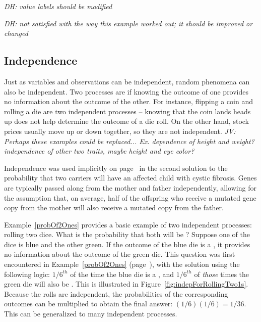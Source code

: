 \textit{DH: value labels should be modified}

\textit{DH: not satisfied with the way this example worked out; it should be improved or changed}

\subsection{Independence}
\label{probabilityIndependence}

Just as variables and observations can be independent, random phenomena can also be independent. Two processes are  if knowing the outcome of one provides no information about the outcome of the other. For instance, flipping a coin and rolling a die are two independent processes -- knowing that the coin lands heads up does not help determine the outcome of a die roll. On the other hand, stock prices usually move up or down together, so they are not independent. \textit{JV: Perhaps these examples could be replaced... Ex. dependence of height and weight? independence of other two traits, maybe height and eye color?}

Independence was used implicitly on page~\pageref{CFInheritanceExample} in the second solution to the probability that two carriers will have an affected child with cystic fibrosis. Genes are typically passed along from the mother and father independently, allowing for the assumption that, on average, half of the offspring who receive a mutated gene copy from the mother will also receive a mutated copy from the father.

Example~\ref{probOf2Ones} provides a basic example of two independent processes: rolling two dice. What is the probability that both will be ? Suppose one of the dice is blue and the other green. If the outcome of the blue die is a , it provides no information about the outcome of the green die. This question was first encountered in Example~\ref{probOf2Ones} (page~\pageref{probOf2Ones}), with the solution using the following logic: $1/6^{th}$ of the time the blue die is a , and $1/6^{th}$ of \emph{those} times the green die will also be . This is illustrated in Figure~\ref{fig:indepForRollingTwo1s}. Because the rolls are independent, the probabilities of the corresponding outcomes can be multiplied to obtain the final answer: $(1/6)(1/6)=1/36$. This can be generalized to many independent processes. 

